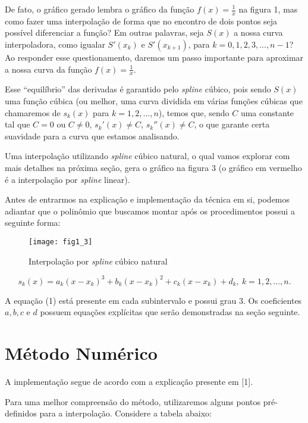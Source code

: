 \documentclass[11pt]{article}
\begin{document}
De fato, o gráfico gerado lembra o gráfico da função $f(x) = \frac{1}{x}$ na
figura 1, mas como fazer uma interpolação de forma que no encontro de dois
pontos seja possível diferenciar a função? Em outras palavras, seja $S(x)$ a
nossa curva interpoladora, como igualar $S'(x_k)$ e $S'(x_{k+1})$, para 
$k = 0, 1, 2, 3, ..., n-1$? Ao responder esse questionamento, daremos um passo
importante para aproximar a nossa curva da função $f(x) = \frac{1}{x}$.

Esse ``equilíbrio'' das derivadas é garantido pelo \textit{spline} cúbico, pois
sendo $S(x)$ uma função cúbica (ou melhor, uma curva dividida em várias funções
cúbicas que chamaremos de $s_k(x)$ para $k = 1, 2, ..., n$), temos que, sendo $C$
uma constante tal que $C = 0$ ou $C \neq 0$, $s_k'(x) \neq C$, $s_k''(x) \neq C$,
o que garante certa suavidade para a curva que estamos analisando.  

Uma interpolação utilizando \textit{spline} cúbico natural, o qual vamos
explorar com mais detalhes na próxima seção, gera o gráfico na
figura 3 (o gráfico em vermelho é a interpolação por \textit{spline} linear).
 
Antes de entrarmos na explicação e implementação da técnica em si, podemos adiantar
que o polinômio que buscamos montar após os procedimentos possui a
seguinte forma:

\begin{figure}[h]
\caption{Interpolação por \textit{spline} cúbico natural}
\texttt{[image: fig1\_3]}
\centering
\end{figure}

\begin{equation}
s_k(x) = a_k(x - x_k)^3 + b_k(x - x_k)^2 + c_k(x - x_k) + d_k, \ k = 1, 2, ..., n.
\end{equation}

A equação (1) está presente em cada subintervalo e possui grau 3.
Os coeficientes $a, b, c$ e $d$ possuem equações explícitas que
serão demonstradas na seção seguinte.

\section{Método Numérico}

A implementação segue de acordo com a explicação presente em [1].

Para uma melhor compreensão do método, utilizaremos alguns pontos
pré-definidos para a interpolação. Considere a tabela abaixo:
\end{document}
